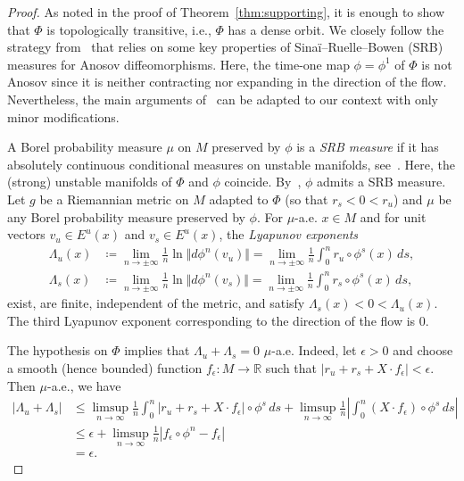 \documentclass[letterpaper, 11pt]{article}
\numberwithin{equation}{section}
\newcommand{\R}{\mathbb{R}}
\begin{document}
\begin{proof} As noted in the proof of Theorem~\ref{thm:supporting}, it is enough to show that $\Phi$ is topologically transitive, i.e., $\Phi$ has a dense orbit. We closely follow the strategy from~\cite{M22} that relies on some key properties of Sina\"{i}--Ruelle--Bowen (SRB) measures for Anosov diffeomorphisms. Here, the time-one map $\phi=\phi^1$ of $\Phi$ is not Anosov since it is neither contracting nor expanding in the direction of the flow. Nevertheless, the main arguments of~\cite{M22} can be adapted to our context with only minor modifications.

A Borel probability measure $\mu$ on $M$ preserved by $\phi$ is a \emph{SRB measure} if it has absolutely continuous conditional measures on unstable manifolds, see~\cite[Definition 1.4.2]{LY85}. Here, the (strong) unstable manifolds of $\Phi$ and $\phi$ coincide. By~\cite[Theorem C]{CY05}, $\phi$ admits a SRB measure. Let $g$ be a Riemannian metric on $M$ adapted to $\Phi$ (so that $r_s < 0 < r_u$) and $\mu$ be any Borel probability measure preserved by $\phi$. For $\mu$-a.e. $x \in M$ and for unit vectors $v_u \in E^u(x)$ and $v_s \in E^u(x)$, the \emph{Lyapunov exponents}
\begin{align*}
\Lambda_u(x) &\coloneqq \lim_{n \rightarrow \pm \infty} \frac{1}{n} \ln \Vert d\phi^n (v_u) \Vert = \lim_{n \rightarrow \pm \infty} \frac{1}{n} \int_0^n r_u \circ \phi^s(x) \, ds, \\
\Lambda_s(x) &\coloneqq \lim_{n \rightarrow \pm \infty} \frac{1}{n} \ln \Vert d\phi^n (v_s) \Vert = \lim_{n \rightarrow \pm \infty} \frac{1}{n}\int_0^n r_s \circ \phi^s(x) \, ds,
\end{align*}
exist, are finite, independent of the metric, and satisfy $\Lambda_s(x) < 0 < \Lambda_u(x)$. The third Lyapunov exponent corresponding to the direction of the flow is $0$.

The hypothesis on $\Phi$ implies that $\Lambda_u + \Lambda_s = 0$ $\mu$-a.e. Indeed, let $\epsilon > 0$ and choose a smooth (hence bounded) function $f_\epsilon : M \rightarrow \R$ such that $| r_u + r_s + X \cdot f_\epsilon| < \epsilon$. Then $\mu$-a.e., we have
\begin{align*}
\vert \Lambda_u + \Lambda_s\vert &\leq \limsup_{n \rightarrow \infty} \frac{1}{n}\int_0^n \vert r_u + r_s + X \cdot f_\epsilon \vert \circ \phi^s \, ds  + \limsup_{n \rightarrow \infty} \frac{1}{n} \left \vert \int_0^n (X \cdot f_\epsilon) \circ \phi^s \, ds \right \vert \\
&\leq \epsilon + \limsup_{n \rightarrow \infty} \frac{1}{n} \left \vert f_\epsilon \circ \phi^n - f_\epsilon \right \vert\\
&= \epsilon.
\end{align*}


\end{proof}
\end{document}
